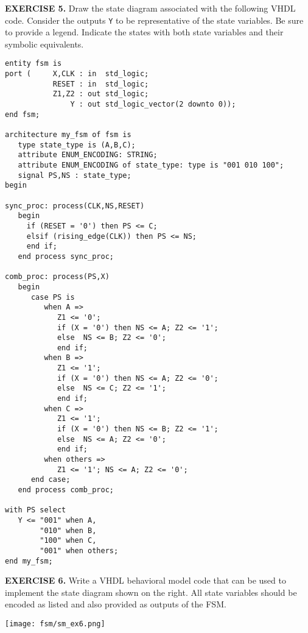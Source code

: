 \vspace{20pt}
\noindent
\begin{minipage}{1\textwidth}
\textbf{EXERCISE 5.}
Draw the state diagram associated with the following VHDL code. Consider the outputs \texttt{Y} to be representative of the state variables. Be sure to provide a legend. Indicate the states with both state variables and their symbolic equivalents.
\end{minipage}
\begin{minipage}{1\textwidth}
\vspace{10px}
\begin{lstlisting}
entity fsm is 
port (     X,CLK : in  std_logic; 
           RESET : in  std_logic; 
           Z1,Z2 : out std_logic;  
               Y : out std_logic_vector(2 downto 0)); 
end fsm;

architecture my_fsm of fsm is
   type state_type is (A,B,C);
   attribute ENUM_ENCODING: STRING; 
   attribute ENUM_ENCODING of state_type: type is "001 010 100";
   signal PS,NS : state_type;
begin

sync_proc: process(CLK,NS,RESET)
   begin
     if (RESET = '0') then PS <= C; 
     elsif (rising_edge(CLK)) then PS <= NS; 
     end if; 
   end process sync_proc; 

comb_proc: process(PS,X)
   begin
      case PS is 
         when A =>    
            Z1 <= '0';  
            if (X = '0') then NS <= A; Z2 <= '1';   
            else  NS <= B; Z2 <= '0';
            end if; 
         when B =>    
            Z1 <= '1';  
            if (X = '0') then NS <= A; Z2 <= '0';  
            else  NS <= C; Z2 <= '1'; 
            end if; 
         when C =>    
            Z1 <= '1';  
            if (X = '0') then NS <= B; Z2 <= '1'; 
            else  NS <= A; Z2 <= '0'; 
            end if; 
         when others =>    
            Z1 <= '1'; NS <= A; Z2 <= '0';  
      end case; 
   end process comb_proc; 
 
with PS select
   Y <= "001" when A, 
        "010" when B, 
        "100" when C, 
        "001" when others; 
end my_fsm;
\end{lstlisting}
\end{minipage}

\vspace{20pt}
\noindent
\begin{minipage}[t]{0.5\textwidth}
\textbf{EXERCISE 6.}
Write a VHDL behavioral model code that can be used to implement the state diagram shown on the right. All state variables should be encoded as listed and also provided as outputs of the FSM.
\end{minipage}
\begin{minipage}[t]{0.47\textwidth}
\vspace{0pt}\raggedright
\centering
\texttt{[image: fsm/sm\_ex6.png]}
\end{minipage}

